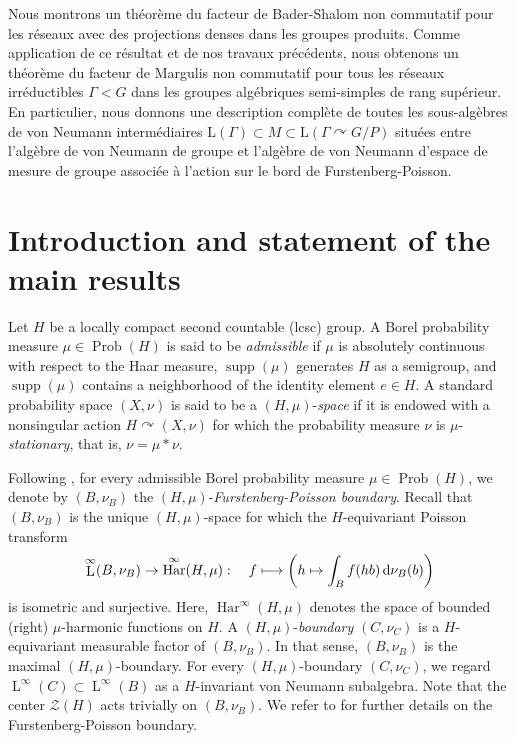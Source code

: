 \documentclass[JEP,XML,SOM,Unicode,published]{cedram}
\newcommand\mto{\mathchoice{\longmapsto}{\mapsto}{\mapsto}{\mapsto}}
\theoremstyle{definition}
\DeclareMathOperator{\Prob}{Prob}
\DeclareMathOperator{\supp}{supp}
\DeclareMathOperator{\rL}{L}
\DeclareMathOperator{\Har}{Har}
\begin{document}
\begin{altabstract}
Nous montrons un théorème du facteur de Bader-Shalom non commutatif pour les réseaux avec des projections denses dans les groupes produits. Comme application de ce résultat et de nos travaux précédents, nous obtenons un théorème du facteur de Margulis non commutatif pour tous les réseaux irréductibles $\Gamma < G$ dans les groupes algébriques semi-simples de rang supérieur. En particulier, nous donnons une description complète de toutes les sous-algèbres de von Neumann intermédiaires $\mathrm{L}(\Gamma) \subset M \subset \mathrm{L}(\Gamma \curvearrowright G/P)$ situées entre l'algèbre de von Neumann de groupe et l'algèbre de von Neumann d'espace de mesure de groupe associée à l'action sur le bord de Furstenberg-Poisson.
\end{altabstract}
\maketitle
\vspace*{-\baselineskip}
\tableofcontents
\mainmatter

\section{Introduction and statement of the main results}

Let $H$ be a locally compact second countable (lcsc) group. A Borel probability measure $\mu \in \Prob(H)$ is said to be \emph{admissible} if $\mu$ is absolutely continuous with respect to the Haar measure, $\supp(\mu)$ generates $H$ as a semigroup, and $\supp(\mu)$ contains a neighborhood of the identity element $e \in H$. A standard probability space $(X, \nu)$ is said to be a $(H, \mu)$-\emph{space} if it is endowed with a nonsingular action $H \curvearrowright (X, \nu)$ for which the probability measure $\nu$ is $\mu$-\emph{stationary}, that is, $\nu = \mu \ast \nu$.

Following \cite{Fu62a, Fu62b}, for every admissible Borel probability measure $\mu \in \Prob(H)$, we denote by $(B, \nu_B)$ the $(H, \mu)$-\emph{Furstenberg-Poisson boundary}. Recall that $(B, \nu_B)$ is the unique $(H, \mu)$-space for which the $H$-equivariant Poisson transform
\[
\rL^\infty(B, \nu_B) \to \Har^\infty(H, \mu) :\quad f \mto \left( h \mapsto \int_B f(h b) \, {\rm d}\nu_B(b) \right)
\]
is isometric and surjective. Here, $\Har^\infty(H, \mu)$ denotes the space of bounded (right) $\mu$-harmonic functions on $H$. A $(H, \mu)$-\emph{boundary} $(C, \nu_C)$ is a $H$-equivariant measurable factor of $(B, \nu_B)$. In that sense, $(B, \nu_B)$ is the maximal $(H, \mu)$-boundary. For every $(H, \mu)$-boundary $(C, \nu_C)$, we regard $\rL^\infty(C) \subset \rL^\infty(B)$ as a $H$-invariant von Neumann subalgebra. Note that the center $\mathscr Z(H)$ acts trivially on $(B, \nu_B)$. We refer to \cite{Fu00, BS04} for further details on the Furstenberg-Poisson boundary.
\end{document}
